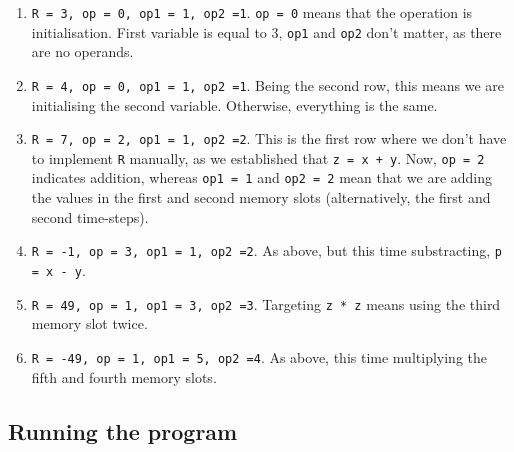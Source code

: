 \documentclass[titlepage]{article}
\theoremstyle{plain}
\theoremstyle{definition}
\begin{document}
		\begin{enumerate}
			
			\item \texttt{R = 3, op = 0, op1 = 1, op2 =1}. \texttt{op = 0} means that the operation is initialisation. First variable is equal to 3, \texttt{op1} and \texttt{op2} don't matter, as there are no operands.
			
			\item \texttt{R = 4, op = 0, op1 = 1, op2 =1}. Being the second row, this means we are initialising the second variable. Otherwise, everything is the same.
			
			\item \texttt{R = 7, op = 2, op1 = 1, op2 =2}. This is the first row where we don't have to implement \texttt{R} manually, as we established that \texttt{z = x + y}. Now, \texttt{op = 2} indicates addition, whereas \texttt{op1 = 1} and \texttt{op2 = 2} mean that we are adding the values in the first and second memory slots (alternatively, the first and second time-steps).
			
			\item \texttt{R = -1, op = 3, op1 = 1, op2 =2}. As above, but this time substracting, \texttt{p = x - y}.
			
			\item \texttt{R = 49, op = 1, op1 = 3, op2 =3}. Targeting \texttt{z * z} means using the third memory slot twice.
			
			\item \texttt{R = -49, op = 1, op1 = 5, op2 =4}. As above, this time multiplying the fifth and fourth memory slots.
			
		\end{enumerate}
		
		\subsection{Running the program}
		
\end{document}
